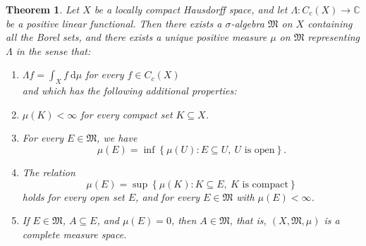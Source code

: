 \documentclass[11pt]{article}
\theoremstyle{thmstyle}
\newtheorem{theorem}{Theorem}[section]
\theoremstyle{defstyle}
\newcommand{\bbC}{\mathbb{C}}
\newcommand{\frakM}{\mathfrak{M}} %
\begin{document}
\begin{theorem}
    Let $X$ be a locally compact Hausdorff space, and let $\Lambda\colon C_c(X)\to\bbC$ be a positive linear functional. Then there exists a $\sigma$-algebra $\frakM$ on $X$ containing all the Borel sets, and there exists a unique positive measure $\mu$ on $\frakM$ representing $\Lambda$ in the sense that: 
    \begin{enumerate}[label=(\arabic*)]
        \item $\Lambda f = \int_X f~\mathrm d\mu$ for every $f\in C_c(X)$ \\and which has the following additional properties: \label{1}
        \item $\mu(K) < \infty$ for every compact set $K\subseteq X$.\label{2}
        \item For every $E\in\frakM$, we have \label{3}
        \begin{equation*}
            \mu(E) = \inf\left\{\mu(U)\colon E\subseteq U,~U\text{ is open}\right\}.
        \end{equation*}
        \item The relation \label{4}
        \begin{equation*}
            \mu(E) = \sup\left\{\mu(K)\colon K\subseteq E,~K\text{ is compact}\right\}
        \end{equation*}
        holds for every open set $E$, and for every $E\in\frakM$ with $\mu(E) < \infty$. 
        \item If $E\in\frakM$, $A\subseteq E$, and $\mu(E) = 0$, then $A\in\frakM$, that is, $(X,\frakM, \mu)$ is a complete measure space.\label{5}
    \end{enumerate}
\end{theorem}
\end{document}

